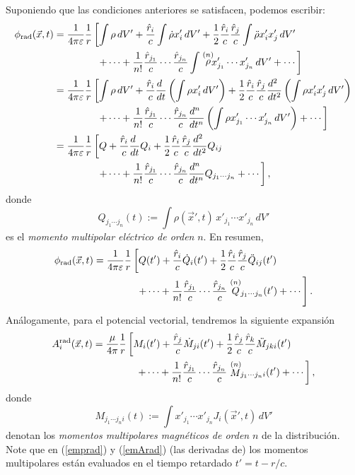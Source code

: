 Suponiendo que las condiciones anteriores se satisfacen, podemos escribir:
\begin{align}
\phi_{\rm rad}(\vec{x},t)
 &= \frac{1}{4\pi\varepsilon}\frac{1}{r}\left[  \int\rho\,dV'+\frac{\hat{r}_i}{c}\int\dot{\rho}x'_i\,dV'+\frac{1}{2}\frac{\hat{r}_i}{c}\frac{\hat{r}_j}{c}\int\ddot{\rho}x'_ix'_j\,dV'\right. \nonumber \\
 &\qquad\qquad\  \left.+\cdots +
\frac{1}{n!}\frac{\hat{r}_{j_1}}{c}\cdots\frac{\hat{r}_{j_n}}{c}\int\stackrel{(n)}{\rho}\!\!\!x'_{j_1}\cdots x'_{j_n}\,dV'+\cdots\right] \\
 &= \frac{1}{4\pi\varepsilon}\frac{1}{r}\left[  \int\rho\,dV'+\frac{\hat{r}_i}{c}\frac{d\ }{dt}\left(\int\rho x'_i\,dV'\right)+\frac{1}{2}\frac{\hat{r}_i}{c}\frac{\hat{r}_j}{c}\frac{d^2\ }{dt^2}\left(\int\rho x'_ix'_j\,dV'\right)\right. \nonumber \\
 &\qquad\qquad\ \left.+\cdots +
\frac{1}{n!}\frac{\hat{r}_{j_1}}{c}\cdots\frac{\hat{r}_{j_n}}{c}\frac{d^n\ }{dt^n}\left(\int\rho x'_{j_1}\cdots x'_{j_n}\,dV'\right) +\cdots\right] \\
 &= \frac{1}{4\pi\varepsilon}\frac{1}{r}\left[  Q+\frac{\hat{r}_i}{c}\frac{d\ }{dt}Q_i+\frac{1}{2}\frac{\hat{r}_i}{c}\frac{\hat{r}_j}{c}\frac{d^2\ }{dt^2}Q_{ij}\right. \nonumber \\
 &\qquad\qquad\ \left.+\cdots +\frac{1}{n!}\frac{\hat{r}_{j_1}}{c}\cdots\frac{\hat{r}_{j_n}}{c}\frac{d^n\ }{dt^n}Q_{j_1\cdots j_n} +\cdots\right] ,
\end{align}
donde
\begin{equation}
 Q_{j_1\cdots j_n}(t):=\int\rho(\vec{x}',t)\, x'_{j_1}\cdots x'_{j_n}\,dV'
\end{equation}
es el \textit{momento multipolar eléctrico de orden} $n$. En resumen,
\begin{align}
 \phi_{\rm rad}(\vec{x},t) &= \frac{1}{4\pi\varepsilon}\frac{1}{r}\left[  Q(t')+\frac{\hat{r}_i}{c}\dot{Q}_i(t')+\frac{1}{2}\frac{\hat{r}_i}{c}\frac{\hat{r}_j}{c}\ddot{Q}_{ij}(t') \right.\nonumber\\
& \qquad\qquad\ \left.+\cdots +\frac{1}{n!}\frac{\hat{r}_{j_1}}{c}\cdots\frac{\hat{r}_{j_n}}{c}\stackrel{(n)}{Q}\!\!{}_{j_1\cdots j_n}(t') +\cdots\right] .  \label{emprad}
\end{align}
Análogamente, para el potencial vectorial, tendremos la siguiente expansión
\begin{align}
A_i^{\rm rad}(\vec{x},t) &= \frac{\mu}{4\pi}\frac{1}{r}\left[  M_i(t')+\frac{\hat{r}_j}{c}\dot{M}_{ji}(t')+\frac{1}{2}\frac{\hat{r}_j}{c}\frac{\hat{r}_k}{c}\ddot{M}_{jki}(t')\right.\nonumber\\
& \qquad\qquad\ \left.+\cdots +\frac{1}{n!}\frac{\hat{r}_{j_1}}{c}\cdots\frac{\hat{r}_{j_n}}{c}\stackrel{(n)}{M}\!\!{}_{j_1\cdots j_ni}(t') +\cdots\right] , \label{emArad}
\end{align}
donde
\begin{equation}
 M_{j_1\cdots j_ni}(t):=\int x'_{j_1}\cdots x'_{j_n}J_i(\vec{x}',t)\,dV'
\end{equation}
denotan los \textit{momentos multipolares magnéticos de orden} $n$ de la distribución. Note que en (\ref{emprad}) y (\ref{emArad}) (las derivadas de) los momentos multipolares están evaluados en el tiempo retardado $t'=t-r/c$.

